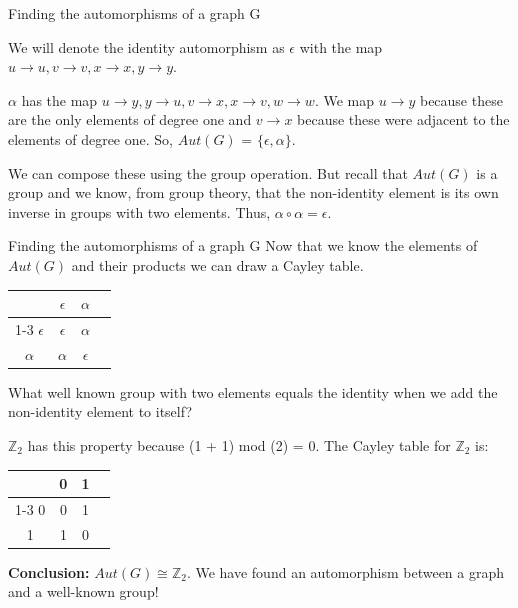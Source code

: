 \documentclass{beamer}
\begin{document}
\begin{frame}{Finding the automorphisms of a graph G}
\begin{center}
\end{center}

We will denote the identity automorphism as $\epsilon$ with the map $u \to u, v \to v, x \to x, y \to y$. \pause

$\alpha$ has the map $u \to y, y \to u, v \to x, x \to v, w \to w$. We map $u \to y$ because these are the only elements of degree one and $v \to x$ because these were adjacent to the elements of degree one. So, $Aut(G)$ = $\{\epsilon, \alpha\}$. \pause

We can compose these using the group operation. But recall that $Aut(G)$ is a group and we know, from group theory, that the non-identity element is its own inverse in groups with two elements. Thus, $\alpha \circ \alpha = \epsilon$.
\end{frame}

\begin{frame}{Finding the automorphisms of a graph G}
Now that we know the elements of $Aut(G)$ and their products we can draw a Cayley table.

\noindent\begin{tabular}{c | c c c}
     & $\epsilon$ & $\alpha$ \\
    \cline{1-3}
    $\epsilon$ & $\epsilon$ & $\alpha$ \\
    $\alpha$ & $\alpha$ & $\epsilon$ \\
\end{tabular}

\smallskip

What well known group with two elements equals the identity when we add the non-identity element to itself? \pause

$\mathbb{Z}_{2}$ has this property because (1 + 1) mod (2) = 0. The Cayley table for $\mathbb{Z}_{2}$ is:

\smallskip
\noindent\begin{tabular}{c | c c c}
     & 0 & 1 \\
    \cline{1-3}
    0 & 0 & 1 \\
    1 & 1 & 0 \\
\end{tabular}

\pause
\medskip

\textbf{Conclusion:} $Aut(G) \cong \mathbb{Z}_{2}$. We have found an automorphism between a graph and a well-known group!
\end{frame}
\end{document}
